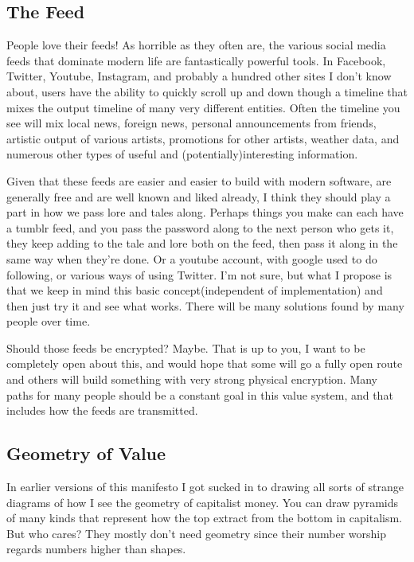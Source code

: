\subsection{The Feed}\label{the-feed}

People love their feeds! As horrible as they often are, the various
social media feeds that dominate modern life are fantastically powerful
tools. In Facebook, Twitter, Youtube, Instagram, and probably a hundred
other sites I don't know about, users have the ability to quickly scroll
up and down though a timeline that mixes the output timeline of many
very different entities. Often the timeline you see will mix local news,
foreign news, personal announcements from friends, artistic output of
various artists, promotions for other artists, weather data, and
numerous other types of useful and (potentially)interesting information.

Given that these feeds are easier and easier to build with modern
software, are generally free and are well known and liked already, I
think they should play a part in how we pass lore and tales along.
Perhaps things you make can each have a tumblr feed, and you pass the
password along to the next person who gets it, they keep adding to the
tale and lore both on the feed, then pass it along in the same way when
they're done. Or a youtube account, with google used to do following, or
various ways of using Twitter. I'm not sure, but what I propose is that
we keep in mind this basic concept(independent of implementation) and
then just try it and see what works. There will be many solutions found
by many people over time.

Should those feeds be encrypted? Maybe. That is up to you, I want to be
completely open about this, and would hope that some will go a fully
open route and others will build something with very strong physical
encryption. Many paths for many people should be a constant goal in this
value system, and that includes how the feeds are transmitted.

\subsection{Geometry of Value}\label{geometry-of-value}

In earlier versions of this manifesto I got sucked in to drawing all
sorts of strange diagrams of how I see the geometry of capitalist money.
You can draw pyramids of many kinds that represent how the top extract
from the bottom in capitalism. But who cares? They mostly don't need
geometry since their number worship regards numbers higher than shapes.

